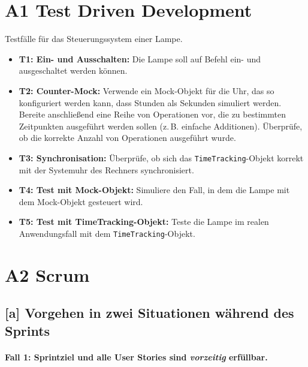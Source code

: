\documentclass[12pt]{article}
\begin{document}
\section*{A1 Test Driven Development}

Testfälle für das Steuerungssystem einer Lampe.

\begin{itemize}

    \item \textbf{T1: Ein- und Ausschalten:}  
    Die Lampe soll auf Befehl ein- und ausgeschaltet werden können.

    \item \textbf{T2: Counter-Mock:}  
    Verwende ein Mock-Objekt für die Uhr, das so konfiguriert werden kann, 
    dass Stunden als Sekunden simuliert werden. Bereite anschließend eine Reihe 
    von Operationen vor, die zu bestimmten Zeitpunkten ausgeführt werden sollen 
    (z.\,B. einfache Additionen). Überprüfe, ob die korrekte Anzahl von Operationen 
    ausgeführt wurde.

    \item \textbf{T3: Synchronisation:}  
    Überprüfe, ob sich das \texttt{TimeTracking}-Objekt korrekt mit der Systemuhr 
    des Rechners synchronisiert.

    \item \textbf{T4: Test mit Mock-Objekt:}  
    Simuliere den Fall, in dem die Lampe mit dem Mock-Objekt gesteuert wird.

    \item \textbf{T5: Test mit TimeTracking-Objekt:}  
    Teste die Lampe im realen Anwendungsfall mit dem \texttt{TimeTracking}-Objekt.

\end{itemize}

\section*{A2 Scrum}

\subsection*{[a] Vorgehen in zwei Situationen während des Sprints}

\paragraph{Fall 1: Sprintziel und alle User Stories sind \emph{vorzeitig} erfüllbar.}
\end{document}
